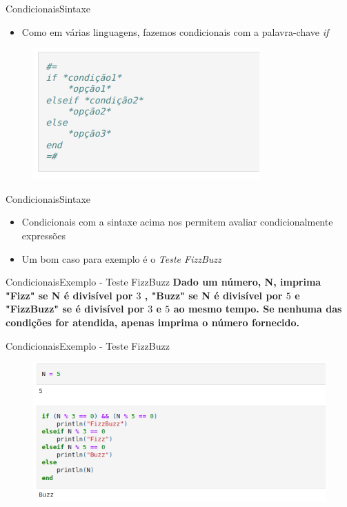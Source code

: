 \documentclass{beamer}
\begin{document}
\begin{frame}{Condicionais}{Sintaxe}
    \begin{itemize}
        \item Como em várias linguagens, fazemos condicionais com a palavra-chave \textit{if}
    \end{itemize}
    \begin{figure}
        \centering
        \includegraphics[scale=0.4]{imagens/if-sintaxe.png}
        \label{fig:my_label}
    \end{figure}
\end{frame}

\begin{frame}{Condicionais}{Sintaxe}
    \begin{itemize}
        \item Condicionais com a sintaxe acima nos permitem avaliar condicionalmente expressões
        \item Um bom caso para exemplo é o \textit{Teste FizzBuzz}
    \end{itemize}
\end{frame}

\begin{frame}{Condicionais}{Exemplo - Teste FizzBuzz}
    \textbf{Dado um número, N, imprima "Fizz" se N é divisível por $3$ , "Buzz" se N é divisível por $5$ e "FizzBuzz" se  é divisível por $3$ e $5$ ao mesmo tempo. Se nenhuma das condições for atendida, apenas imprima o número fornecido.}
\end{frame}

\begin{frame}{Condicionais}{Exemplo - Teste FizzBuzz}
     \begin{figure}
        \centering
        \includegraphics[scale=0.5]{imagens/teste-fizzbuzz.png}
        \label{fig:my_label}
    \end{figure}   
\end{frame}
\end{document}
